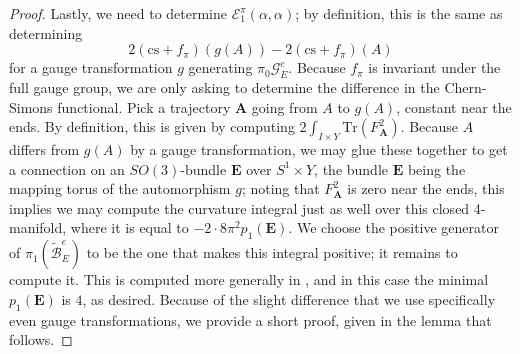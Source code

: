 \documentclass[10pt,a4paper]{amsart}
\theoremstyle{definition}
\theoremstyle{remark}
\numberwithin{figure}{qchap}
\begin{document}
\begin{proof}
Lastly, we need to determine $\mathcal E^\pi_1(\alpha, \alpha)$; by definition, this is the same as determining 
$$2(\text{cs}+f_\pi)(g(A)) - 2(\text{cs}+f_\pi)(A)$$ 
for a gauge transformation $g$ generating $\pi_0 \mathcal G^e_E$. Because $f_\pi$ is invariant under the full gauge group, we are only asking to determine the difference in the Chern-Simons functional. Pick a trajectory $\mathbf{A}$ going from $A$ to $g(A)$, constant near the ends. 
By definition, this is given by computing $2\int_{I \times Y} \text{Tr}(F_{\mathbf{A}}^2)$. Because $A$ differs from $g(A)$ by a gauge transformation, we may glue these together to get a connection on an $SO(3)$-bundle $\mathbf{E}$ over $S^1 \times Y$, the bundle $\mathbf{E}$ being the mapping torus of the automorphism $g$; noting that $F_{\mathbf{A}}^2$ is zero near the ends, this implies we may compute the curvature integral just as well over this closed 4-manifold, where it is equal to $-2 \cdot 8\pi^2 p_1(\mathbf{E})$. We choose the positive generator of $\pi_1(\widetilde{\mathcal B}^e_E)$ to be the one that makes this integral positive; it remains to compute it. This is computed more generally in \cite[Equation~(24)]{KM1}, and in this case the minimal $p_1(\mathbf{E})$ is $4$, as desired. Because of the slight difference that we use specifically even gauge transformations, we provide a short proof, given in the lemma that follows. 
\end{proof}
\end{document}
